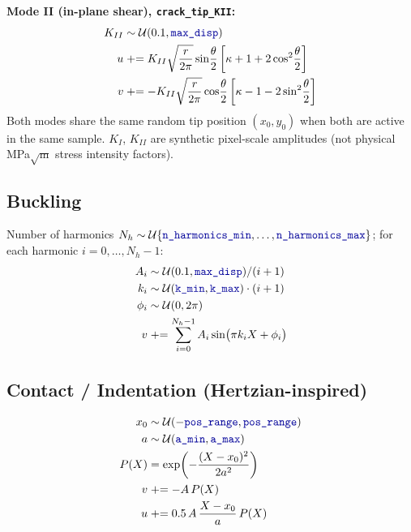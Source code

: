 \documentclass[11pt]{article}
\newcommand{\param}[1]{\texttt{\color{blue!60!black}#1}}
\begin{document}
\textbf{Mode II (in-plane shear), \texttt{crack\_tip\_KII}:}
\begin{align}
K_{II} &\sim \mathcal{U}(0.1, \param{max\_disp}) \\
u &\mathrel{+}= K_{II} \sqrt{\frac{r}{2\pi}} \sin\!\frac{\theta}{2}
\left[\kappa + 1 + 2\cos^2\!\frac{\theta}{2}\right] \\
v &\mathrel{+}= -K_{II} \sqrt{\frac{r}{2\pi}} \cos\!\frac{\theta}{2}
\left[\kappa - 1 - 2\sin^2\!\frac{\theta}{2}\right]
\end{align}
Both modes share the same random tip position $(x_0, y_0)$ when both are
active in the same sample. $K_I$, $K_{II}$ are synthetic pixel-scale
amplitudes (not physical MPa$\sqrt{\text{m}}$ stress intensity factors).

\subsection{Buckling}
Number of harmonics $N_h \sim \mathcal{U}\{\param{n\_harmonics\_min}, \dots, \param{n\_harmonics\_max}\}$;
for each harmonic $i = 0, \dots, N_h-1$:
\begin{align}
A_i &\sim \mathcal{U}(0.1, \param{max\_disp}) / (i+1) \\
k_i &\sim \mathcal{U}(\param{k\_min}, \param{k\_max}) \cdot (i+1) \\
\phi_i &\sim \mathcal{U}(0, 2\pi) \\
v &\mathrel{+}= \sum_{i=0}^{N_h-1} A_i \sin\!\big(\pi k_i X + \phi_i\big)
\end{align}

\subsection{Contact / Indentation (Hertzian-inspired)}
\begin{align}
x_0 &\sim \mathcal{U}(-\param{pos\_range}, \param{pos\_range}) \\
a &\sim \mathcal{U}(\param{a\_min}, \param{a\_max}) \\
P(X) &= \exp\!\left(-\frac{(X-x_0)^2}{2a^2}\right) \\
v &\mathrel{+}= -A\,P(X) \\
u &\mathrel{+}= 0.5\,A\,\frac{X - x_0}{a}\,P(X)
\end{align}
\end{document}

